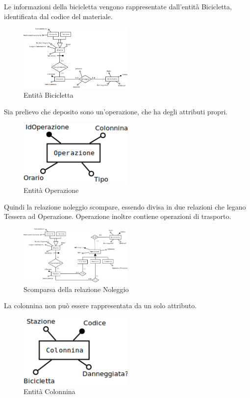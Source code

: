 \documentclass[a4paper,twoside]{article}
\begin{document}
Le informazioni della bicicletta vengono rappresentate dall'entità Bicicletta, identificata dal codice del materiale.
\begin{figure}[H]
 \centering
  \includegraphics[width=0.5\textwidth]{Immagini-Grafici/Concettuale05.png}
\caption{Entità Bicicletta}
\end{figure}
Sia prelievo che deposito sono un'operazione, che ha degli attributi propri.
\begin{figure}[H]
 \centering
  \includegraphics[width=0.5\textwidth]{Immagini-Grafici/Concettuale06.png}
\caption{Entità Operazione}
\end{figure}
Quindi la relazione noleggio scompare, essendo divisa in due relazioni che legano Tessera ad Operazione. Operazione inoltre contiene operazioni di trasporto.
\begin{figure}[H]
 \centering
  \includegraphics[width=0.5\textwidth]{Immagini-Grafici/Concettuale07.png}
\caption{Scomparsa della relazione Noleggio}
\end{figure}
La colonnina non può essere rappresentata da un solo attributo.
\begin{figure}[H]
 \centering
  \includegraphics[width=0.5\textwidth]{Immagini-Grafici/Concettuale08.png}
\caption{Entità Colonnina}
\end{figure}
\end{document}

